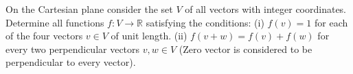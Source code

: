 On the Cartesian plane consider the set $V$ of all vectors with integer coordinates. Determine all functions $f : V \rightarrow \mathbb{R}$ satisfying the conditions:
(i) $f(v) = 1$ for each of the four vectors $v \in V$ of unit length.
(ii) $f(v+w) = f(v)+f(w)$ for every two perpendicular vectors $v, w \in V$
(Zero vector is considered to be perpendicular to every vector).